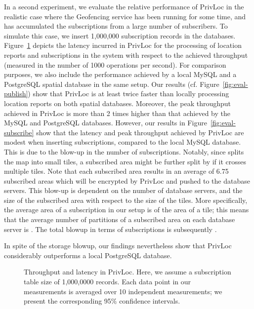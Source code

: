 \documentclass{llncs}
\newcommand\sol{{\sf PrivLoc}}
\begin{document}
In a second experiment, we evaluate the relative performance of \sol{} in the realistic case where
the Geofencing service has been running for some time, and has accumulated the subscriptions from a large number of subscribers. To simulate this case, we insert 1,000,000 subscription records in the databases.
Figure~\ref{fig:throughput} depicts the latency incurred in \sol{} for the processing of location reports and subscriptions in the system with respect to the
achieved throughput (measured in the number of 1000 operations
per second). For comparison purposes, we also include the performance achieved by a local MySQL and a PostgreSQL spatial database in the same setup.
Our results (cf. Figure~\ref{fig:eval-publish}) show that \sol{} is at least twice faster than locally processing location reports on both spatial databases. Moreover, the peak throughput achieved in \sol{} is more than 2 times higher than that
achieved by the MySQL and PostgreSQL databases. However, our results in Figure~\ref{fig:eval-subscribe} show that the latency and peak throughput achieved by \sol{} are modest when inserting subscriptions, compared to the local MySQL database.
This is due to the blow-up in the number of subscriptions. Notably, since  splits the map into small tiles, a subscribed area might
be further split by  if it crosses multiple tiles. Note that each subscribed area results in an average of 6.75 subscribed areas which will be encrypted
by \sol{} and pushed to the  database servers. This blow-up is dependent on the number of database servers, and the size of the
subscribed area with respect to the size of the tiles. More specifically, the average area of a subscription in our setup is  of the area of a tile; this means that the
average number of partitions of a subscribed area on each database server is . The total blowup in terms of subscriptions is subsequently .

In spite of the storage blowup, our findings nevertheless show that \sol{} considerably outperforms a local PostgreSQL database.


\begin{figure}[tbp]
\hfill
{}
\hfill
{}
\hfill
\caption{Throughput and latency in \sol. Here, we assume a subscription table size of 1,000,0000 records. Each data point in our measurements is averaged over 10 independent measurements; we present the corresponding 95\% confidence intervals.}
\label{fig:throughput}
\vspace{-1 em}
\end{figure}
\vspace{-1 em}
\end{document}
